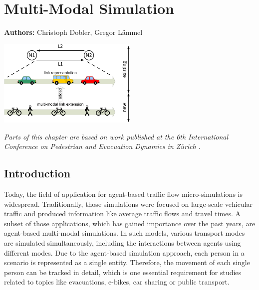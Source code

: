 \chapter{Multi-Modal Simulation}
\label{ch:multimodalsim}

\hfill \textbf{Authors:} Christoph Dobler, Gregor Lämmel

\begin{center} \includegraphics[width=0.5\textwidth, angle=0]{extending/figures/MultiModalSimulation/multi-modal-link-extension} \end{center}


\textit{Parts of this chapter are based on work published at the 6th International Conference on Pedestrian and Evacuation Dynamics in Zürich  \citep{DoblerLaemmel_PED_2012}}.


\section{Introduction}
Today, the field of application for agent-based traffic flow micro-simulations is widespread. Traditionally, those simulations were focused on large-scale vehicular traffic and produced information like average traffic flows and travel times. A subset of those applications, which has gained importance over the past years, are agent-based multi-modal simulations. In such models, various transport modes are simulated simultaneously, including the interactions between agents using different modes. Due to the agent-based simulation approach, each person in a scenario is represented as a single entity. Therefore, the movement of each single person can be tracked in detail, which is one essential requirement for studies related to topics like evacuations, e-bikes, car sharing or public transport.

